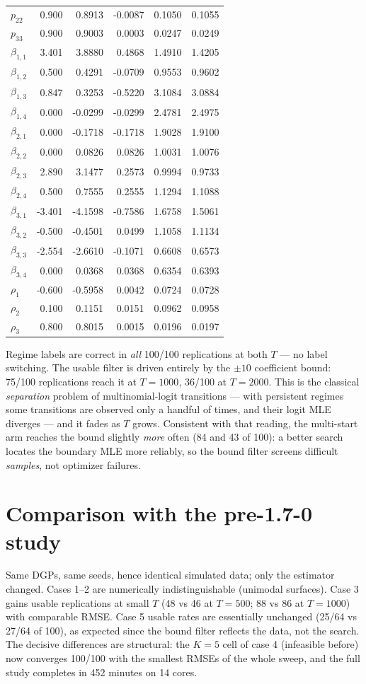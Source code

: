 \documentclass[11pt]{article}
\begin{document}
\begin{table}[!htbp]
\begin{tabular}{lrrrrr}
$p_{22}$ & 0.900 & 0.8913 & -0.0087 & 0.1050 & 0.1055\\
$p_{33}$ & 0.900 & 0.9003 & 0.0003 & 0.0247 & 0.0249\\
$\beta_{1,1}$ & 3.401 & 3.8880 & 0.4868 & 1.4910 & 1.4205\\
$\beta_{1,2}$ & 0.500 & 0.4291 & -0.0709 & 0.9553 & 0.9602\\
$\beta_{1,3}$ & 0.847 & 0.3253 & -0.5220 & 3.1084 & 3.0884\\
$\beta_{1,4}$ & 0.000 & -0.0299 & -0.0299 & 2.4781 & 2.4975\\
$\beta_{2,1}$ & 0.000 & -0.1718 & -0.1718 & 1.9028 & 1.9100\\
$\beta_{2,2}$ & 0.000 & 0.0826 & 0.0826 & 1.0031 & 1.0076\\
$\beta_{2,3}$ & 2.890 & 3.1477 & 0.2573 & 0.9994 & 0.9733\\
$\beta_{2,4}$ & 0.500 & 0.7555 & 0.2555 & 1.1294 & 1.1088\\
$\beta_{3,1}$ & -3.401 & -4.1598 & -0.7586 & 1.6758 & 1.5061\\
$\beta_{3,2}$ & -0.500 & -0.4501 & 0.0499 & 1.1058 & 1.1134\\
$\beta_{3,3}$ & -2.554 & -2.6610 & -0.1071 & 0.6608 & 0.6573\\
$\beta_{3,4}$ & 0.000 & 0.0368 & 0.0368 & 0.6354 & 0.6393\\
$\rho_1$ & -0.600 & -0.5958 & 0.0042 & 0.0724 & 0.0728\\
$\rho_2$ & 0.100 & 0.1151 & 0.0151 & 0.0962 & 0.0958\\
$\rho_3$ & 0.800 & 0.8015 & 0.0015 & 0.0196 & 0.0197\\
\bottomrule
\end{tabular}
\end{table}
Regime labels are correct in \emph{all} 100/100 replications at both $T$
--- no label switching. The usable filter is driven entirely by the
$\pm 10$ coefficient bound: 75/100 replications reach it at $T = 1000$,
36/100 at $T = 2000$. This is the classical \emph{separation} problem of
multinomial-logit transitions --- with persistent regimes some transitions
are observed only a handful of times, and their logit MLE diverges ---
and it fades as $T$ grows. Consistent with that reading, the multi-start
arm reaches the bound slightly \emph{more} often (84 and 43 of 100):
a better search locates the boundary MLE more reliably, so the bound
filter screens difficult \emph{samples}, not optimizer failures.
\section{Comparison with the pre-1.7-0 study}
Same DGPs, same seeds, hence identical simulated data; only the estimator
changed. Cases 1--2 are numerically indistinguishable (unimodal surfaces).
Case 3 gains usable replications at small $T$ (48 vs 46 at $T=500$; 88 vs
86 at $T=1000$) with comparable RMSE. Case 5 usable rates are essentially
unchanged (25/64 vs 27/64 of 100), as expected since the bound filter
reflects the data, not the search. The decisive differences are
structural: the $K = 5$ cell of case 4 (infeasible before) now converges
100/100 with the smallest RMSEs of the whole sweep, and the full study
completes in 452 minutes on 14 cores.
\end{document}
